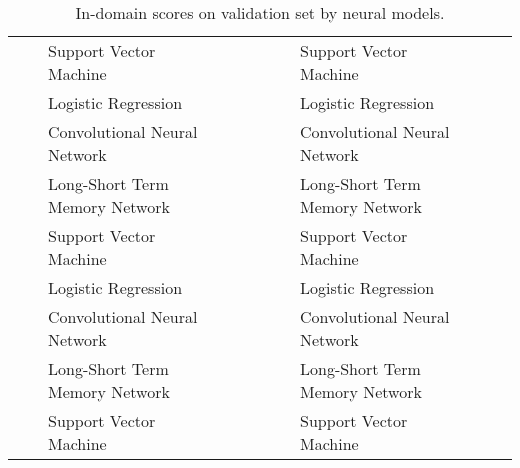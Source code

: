 \begin{landscape}
\begin{table}[]
{\begin{tabular}{l|clllll|}
                            &                         & Support Vector Machine         &          &          &           &         &                         & Support Vector Machine         &          &          &           &         \\
  &         & Logistic Regression            &          &          &           &         &         & Logistic Regression            &          &          &           &         \\
                            &                         & Convolutional Neural Network   &          &          &           &         &                         & Convolutional Neural Network   &          &          &           &         \\
                            &                         & Long-Short Term Memory Network &          &          &           &         &                         & Long-Short Term Memory Network &          &          &           &         \\
                            &                         & Support Vector Machine         &          &          &           &         &                         & Support Vector Machine         &          &          &           &         \\
                            &        & Logistic Regression            &          &          &           &         &        & Logistic Regression            &          &          &           &         \\
                            &                         & Convolutional Neural Network   &          &          &           &         &                         & Convolutional Neural Network   &          &          &           &         \\
                            &                         & Long-Short Term Memory Network &          &          &           &         &                         & Long-Short Term Memory Network &          &          &           &         \\
                            &                         & Support Vector Machine         &          &          &           &         &                         & Support Vector Machine         &          &          &           &         \\
\end{tabular}%
}
\caption{In-domain scores on validation set by neural models.}
\label{tab:redux_onehot_neural_dev}
\end{table}
\end{landscape}

